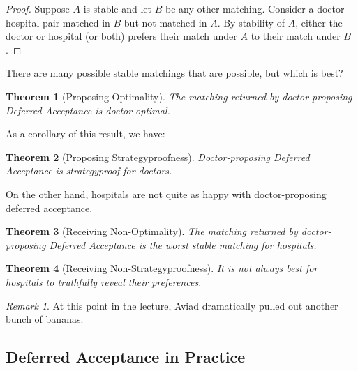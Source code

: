 \documentclass[dvipsnames]{article}
\newtheorem{theorem}{Theorem}[section]
\theoremstyle{definition}
\theoremstyle{remark}
\newtheorem*{remark}{Remark}
\begin{document}
\begin{proof}
	Suppose $A$ is stable and let $B$ be any other matching. Consider a doctor-hospital pair matched in $B$ but not matched in $A$. By stability of $A$, either the doctor or hospital (or both) prefers their match under $A$ to their match under $B$.
\end{proof}

There are many possible stable matchings that are possible, but which is best?

\begin{theorem}[Proposing Optimality]
	The matching returned by doctor-proposing Deferred Acceptance is doctor-optimal. 
\end{theorem} 

As a corollary of this result, we have:

\begin{theorem}[Proposing Strategyproofness]
	Doctor-proposing Deferred Acceptance is strategyproof for doctors. 
\end{theorem}

On the other hand, hospitals are not quite as happy with doctor-proposing deferred acceptance. 

\begin{theorem}[Receiving Non-Optimality]
	The matching returned by doctor-proposing Deferred Acceptance is the worst stable matching for hospitals. 
\end{theorem}

\begin{theorem}[Receiving Non-Strategyproofness]
	It is not always best for hospitals to truthfully reveal their preferences. 
\end{theorem}

\begin{remark}
	At this point in the lecture, Aviad dramatically pulled out another bunch of bananas.
\end{remark}

\subsection{Deferred Acceptance in Practice}
\end{document}
